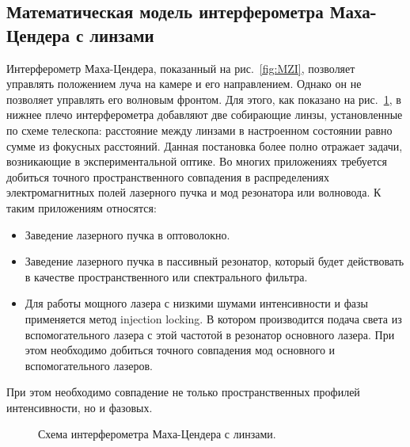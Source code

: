 \subsection{Математическая модель интерферометра Маха-Цендера с линзами}\label{sec:ch2/sec1/subsec4}

Интерферометр Маха-Цендера, показанный на рис.~\ref{fig:MZI}, позволяет управлять положением луча на камере и его направлением. Однако он не позволяет управлять его волновым фронтом. Для этого, как показано на рис.~\ref{fig:MZI_expl_lenses}, в нижнее плечо интерферометра добавляют две собирающие линзы, установленные по схеме телескопа: расстояние между линзами в настроенном состоянии равно сумме из фокусных расстояний. Данная постановка более полно отражает задачи, возникающие в экспериментальной оптике. Во многих приложениях требуется добиться точного пространственного совпадения в распределениях электромагнитных полей лазерного пучка и мод резонатора или волновода. К таким приложениям относятся: 

\begin{itemize}
    \item Заведение лазерного пучка в оптоволокно.
    \item Заведение лазерного пучка в пассивный резонатор, который будет действовать в качестве пространственного или спектрального фильтра.
    \item Для работы мощного лазера с низкими шумами интенсивности и фазы применяется метод injection locking. В котором производится подача света из вспомогательного лазера с этой частотой в резонатор основного лазера. При этом необходимо добиться точного совпадения мод основного и вспомогательного лазеров.
\end{itemize}

При этом необходимо совпадение не только пространственных профилей интенсивности, но и фазовых.

\begin{figure}[ht]
\caption{Схема интерферометра Маха-Цендера с линзами.}
\label{fig:MZI_expl_lenses}
\end{figure}

